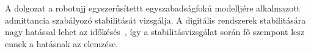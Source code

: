 A dolgozat a robotujj egyszerűsítettt egyszabadságfokú modelljére alkalmazott admittancia szabályozó stabilitását vizsgálja.
A digitális rendszerek stabilitására nagy hatással lehet az időkésés~\cite{stepan1989retarded,stepan2001vibrations}, így a 
stabilitásvizsgálat során fő szempont lesz ennek a hatásnak az elemzése.


    
    
